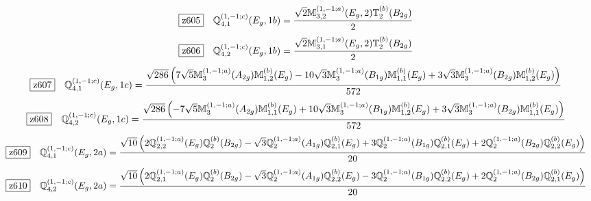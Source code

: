 \documentclass[fleqn,10pt,landscape]{jsarticle}
\begin{document}
\begin{dmath*}
\hspace*{3mm}\fbox{z605}\quad \mathbb{Q}_{4,1}^{(1,-1;c)}(E_{g},1b)=\frac{\sqrt{2} \mathbb{M}_{3,2}^{(1,-1;a)}(E_{g},2) \mathbb{T}_{2}^{(b)}(B_{2g})}{2}
\end{dmath*}
\begin{dmath*}
\hspace*{3mm}\fbox{z606}\quad \mathbb{Q}_{4,2}^{(1,-1;c)}(E_{g},1b)=\frac{\sqrt{2} \mathbb{M}_{3,1}^{(1,-1;a)}(E_{g},2) \mathbb{T}_{2}^{(b)}(B_{2g})}{2}
\end{dmath*}
\begin{dmath*}
\hspace*{3mm}\fbox{z607}\quad \mathbb{Q}_{4,1}^{(1,-1;c)}(E_{g},1c)=\frac{\sqrt{286} \left(7 \sqrt{5} \mathbb{M}_{3}^{(1,-1;a)}(A_{2g}) \mathbb{M}_{1,2}^{(b)}(E_{g}) - 10 \sqrt{3} \mathbb{M}_{3}^{(1,-1;a)}(B_{1g}) \mathbb{M}_{1,1}^{(b)}(E_{g}) + 3 \sqrt{3} \mathbb{M}_{3}^{(1,-1;a)}(B_{2g}) \mathbb{M}_{1,2}^{(b)}(E_{g})\right)}{572}
\end{dmath*}
\begin{dmath*}
\hspace*{3mm}\fbox{z608}\quad \mathbb{Q}_{4,2}^{(1,-1;c)}(E_{g},1c)=\frac{\sqrt{286} \left(- 7 \sqrt{5} \mathbb{M}_{3}^{(1,-1;a)}(A_{2g}) \mathbb{M}_{1,1}^{(b)}(E_{g}) + 10 \sqrt{3} \mathbb{M}_{3}^{(1,-1;a)}(B_{1g}) \mathbb{M}_{1,2}^{(b)}(E_{g}) + 3 \sqrt{3} \mathbb{M}_{3}^{(1,-1;a)}(B_{2g}) \mathbb{M}_{1,1}^{(b)}(E_{g})\right)}{572}
\end{dmath*}
\begin{dmath*}
\hspace*{3mm}\fbox{z609}\quad \mathbb{Q}_{4,1}^{(1,-1;c)}(E_{g},2a)=\frac{\sqrt{10} \left(2 \mathbb{Q}_{2,2}^{(1,-1;a)}(E_{g}) \mathbb{Q}_{2}^{(b)}(B_{2g}) - \sqrt{3} \mathbb{Q}_{2}^{(1,-1;a)}(A_{1g}) \mathbb{Q}_{2,1}^{(b)}(E_{g}) + 3 \mathbb{Q}_{2}^{(1,-1;a)}(B_{1g}) \mathbb{Q}_{2,1}^{(b)}(E_{g}) + 2 \mathbb{Q}_{2}^{(1,-1;a)}(B_{2g}) \mathbb{Q}_{2,2}^{(b)}(E_{g})\right)}{20}
\end{dmath*}
\begin{dmath*}
\hspace*{3mm}\fbox{z610}\quad \mathbb{Q}_{4,2}^{(1,-1;c)}(E_{g},2a)=\frac{\sqrt{10} \left(2 \mathbb{Q}_{2,1}^{(1,-1;a)}(E_{g}) \mathbb{Q}_{2}^{(b)}(B_{2g}) - \sqrt{3} \mathbb{Q}_{2}^{(1,-1;a)}(A_{1g}) \mathbb{Q}_{2,2}^{(b)}(E_{g}) - 3 \mathbb{Q}_{2}^{(1,-1;a)}(B_{1g}) \mathbb{Q}_{2,2}^{(b)}(E_{g}) + 2 \mathbb{Q}_{2}^{(1,-1;a)}(B_{2g}) \mathbb{Q}_{2,1}^{(b)}(E_{g})\right)}{20}
\end{dmath*}
\end{document}
